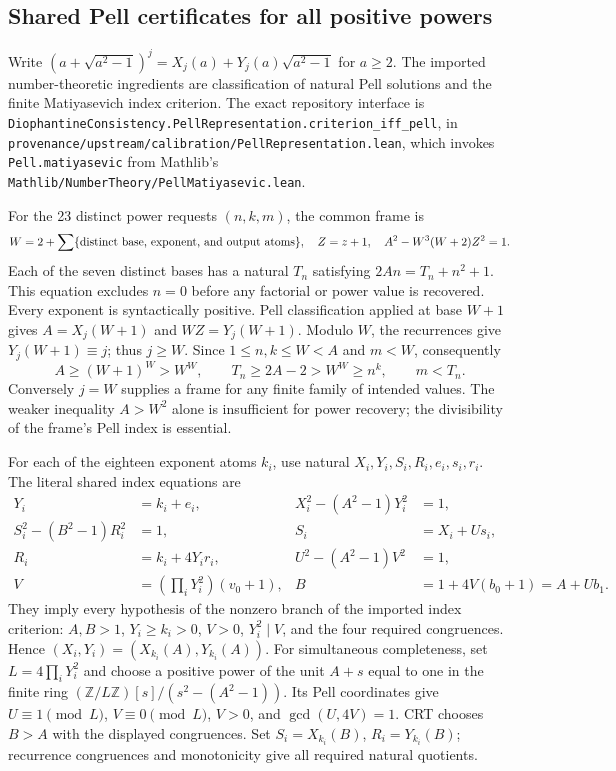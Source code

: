 \subsection{Shared Pell certificates for all positive powers}

Write
$(a+\sqrt{a^2-1})^j=X_j(a)+Y_j(a)\sqrt{a^2-1}$ for $a\ge2$.
The imported number-theoretic ingredients are classification of natural
Pell solutions and the finite Matiyasevich index criterion.  The exact
repository interface is
\nolinkurl{DiophantineConsistency.PellRepresentation.criterion_iff_pell},
in \nolinkurl{provenance/upstream/calibration/PellRepresentation.lean},
which invokes \nolinkurl{Pell.matiyasevic} from Mathlib's
\nolinkurl{Mathlib/NumberTheory/PellMatiyasevic.lean}.

For the 23 distinct power requests $(n,k,m)$, the common frame is
\[
 W=2+\sum\{\hbox{distinct base, exponent, and output atoms}\},\quad
 Z=z+1,\quad A^2-W^3(W+2)Z^2=1.
\]
Each of the seven distinct bases has a natural $T_n$ satisfying
$2An=T_n+n^2+1$.  This equation excludes $n=0$ before any factorial or
power value is recovered.  Every exponent is syntactically positive.
Pell classification applied at base $W+1$ gives
$A=X_j(W+1)$ and $WZ=Y_j(W+1)$.
Modulo $W$, the recurrences give $Y_j(W+1)\equiv j$; thus
$j\ge W$.  Since $1\le n,k\le W<A$ and $m<W$, consequently
\[
 A\ge(W+1)^W>W^W,\qquad
 T_n\ge2A-2>W^W\ge n^k,\qquad m<T_n.
\]
Conversely $j=W$ supplies a frame for any finite family of intended
values.  The weaker inequality $A>W^2$ alone is insufficient for power
recovery; the divisibility of the frame's Pell index is essential.

For each of the eighteen exponent atoms $k_i$, use natural
$X_i,Y_i,S_i,R_i,e_i,s_i,r_i$.  The literal shared index equations are
\begin{align*}
 Y_i&=k_i+e_i,&X_i^2-(A^2-1)Y_i^2&=1,\\
 S_i^2-(B^2-1)R_i^2&=1,&S_i&=X_i+Us_i,\\
 R_i&=k_i+4Y_ir_i,&U^2-(A^2-1)V^2&=1,\\
 V&=\left(\prod_iY_i^2\right)(v_0+1),&
 B&=1+4V(b_0+1)=A+Ub_1.
\end{align*}
They imply every hypothesis of the nonzero branch of the imported index
criterion: $A,B>1$, $Y_i\ge k_i>0$, $V>0$, $Y_i^2\mid V$, and the four
required congruences.  Hence $(X_i,Y_i)=(X_{k_i}(A),Y_{k_i}(A))$.
For simultaneous completeness, set $L=4\prod_iY_i^2$ and choose a positive
power of the unit $A+s$ equal to one in the finite ring
$(\mathbb Z/L\mathbb Z)[s]/(s^2-(A^2-1))$.
Its Pell coordinates give $U\equiv1\pmod L$, $V\equiv0\pmod L$, $V>0$,
and $\gcd(U,4V)=1$.  CRT chooses $B>A$ with the displayed congruences.
Set $S_i=X_{k_i}(B)$, $R_i=Y_{k_i}(B)$; recurrence congruences and
monotonicity give all required natural quotients.

